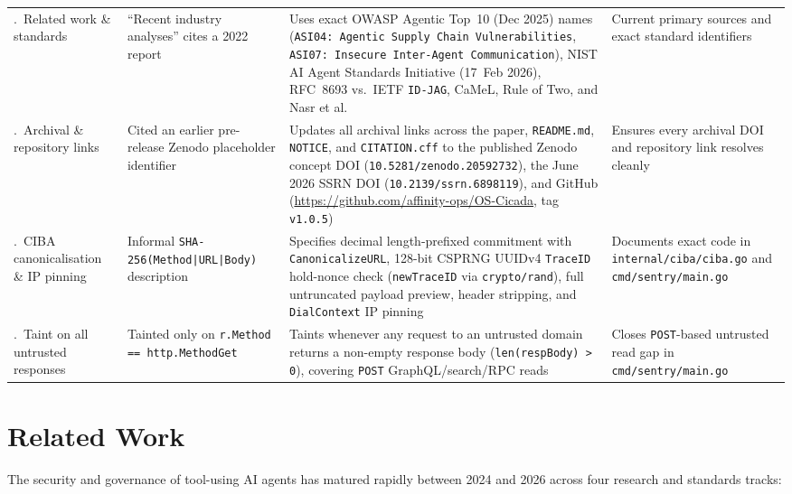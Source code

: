 \documentclass[11pt, a4paper]{article}
\begin{document}
\begin{small}
\begin{longtable}{@{} p{2.6cm} p{3.6cm} p{5.2cm} p{4.0cm} @{}}
\addlinespace
9.~Related work \& standards & ``Recent industry analyses'' cites a 2022 report & Uses exact OWASP Agentic Top~10 (Dec 2025) names (\texttt{ASI04: Agentic Supply Chain Vulnerabilities}, \texttt{ASI07: Insecure Inter-Agent Communication}), NIST AI Agent Standards Initiative (17~Feb 2026), RFC~8693 vs.\ IETF \texttt{ID-JAG}, CaMeL, Rule of Two, and Nasr et al. & Current primary sources and exact standard identifiers \\
\addlinespace
10.~Archival \& repository links & Cited an earlier pre-release Zenodo placeholder identifier & Updates all archival links across the paper, \texttt{README.md}, \texttt{NOTICE}, and \texttt{CITATION.cff} to the published Zenodo concept DOI (\texttt{10.5281/zenodo.20592732}), the June 2026 SSRN DOI (\texttt{10.2139/ssrn.6898119}), and GitHub (\url{https://github.com/affinity-ops/OS-Cicada}, tag \texttt{v1.0.5}) & Ensures every archival DOI and repository link resolves cleanly \\
\addlinespace
11.~CIBA canonicalisation \& IP pinning & Informal \texttt{SHA-256(Method|URL|Body)} description & Specifies decimal length-prefixed commitment with \texttt{CanonicalizeURL}, 128-bit CSPRNG UUIDv4 \texttt{TraceID} hold-nonce check (\texttt{newTraceID} via \texttt{crypto/rand}), full untruncated payload preview, header stripping, and \texttt{DialContext} IP pinning & Documents exact code in \texttt{internal/ciba/ciba.go} and \texttt{cmd/sentry/main.go} \\
\addlinespace
12.~Taint on all untrusted responses & Tainted only on \texttt{r.Method == http.MethodGet} & Taints whenever any request to an untrusted domain returns a non-empty response body (\texttt{len(respBody) > 0}), covering \texttt{POST} GraphQL/search/RPC reads & Closes \texttt{POST}-based untrusted read gap in \texttt{cmd/sentry/main.go} \\
\end{longtable}
\end{small}

\section{Related Work}
\label{sec:related-work}

The security and governance of tool-using AI agents has matured rapidly between 2024 and 2026 across four research and standards tracks:
\end{document}
